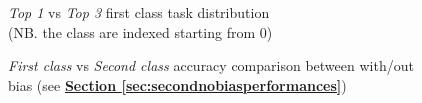 \documentclass[12pt]{article}
\begin{document}
\begin{figure}[!tbp]
  \centering
  \hfill
  \captionsetup{justification   = centering}
\caption{\textit{Top 1} vs \textit{Top 3} first class task distribution \\(NB. the class are indexed starting from 0)}
\label{testclassdistrib}
\end{figure}

\begin{figure}[!tbp]
  \centering
  \hfill
    \captionsetup{justification   = centering}
    \caption{\textit{First class} vs \textit{Second class} accuracy comparison between with/out bias (see \hyperref[sec:secondnobiasperformances]{\textbf{Section \ref{sec:secondnobiasperformances}}})}
\label{nobiasvs41test}
\end{figure}
\end{document}
